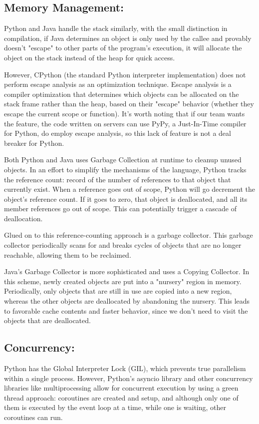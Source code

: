\subsection{Memory Management:}
Python and Java handle the stack similarly, with the small distinction in compilation, if Java determines an object is only used by the callee and provably doesn't "escape" to other parts of the program's execution, it will allocate the object on the stack instead of the heap for quick access.

However, CPython (the standard Python interpreter implementation) does not perform escape analysis as an optimization technique. Escape analysis is a compiler optimization that determines which objects can be allocated on the stack frame rather than the heap, based on their "escape" behavior (whether they escape the current scope or function).
It's worth noting that if our team wants the feature, the code written on servers can use PyPy, a Just-In-Time compiler for Python, do employ escape analysis, so this lack of feature is not a deal breaker for Python.

Both Python and Java uses Garbage Collection at runtime to cleanup unused objects. In an effort to simplify the mechanisms of the language, Python tracks the reference count: record of the number of references to that object that currently exist. When a reference goes out of scope, Python will go decrement the object's reference count. If it goes to zero, that object is deallocated, and all its member references go out of scope. This can potentially trigger a cascade of deallocation.

Glued on to this reference-counting approach is a garbage collector. This garbage collector periodically scans for and breaks cycles of objects that are no longer reachable, allowing them to be reclaimed.

Java's Garbage Collector is more sophisticated and uses a Copying Collector. In this scheme, newly created objects are put into a "nursery" region in memory. Periodically, only objects that are still in use are copied into a new region, whereas the other objects are deallocated by abandoning the nursery. This leads to favorable cache contents and faster behavior, since we don't need to visit the objects that are deallocated.

\subsection{Concurrency:}
Python has the Global Interpreter Lock (GIL), which prevents true parallelism within a single process. However, Python's asyncio library and other concurrency libraries like multiprocessing allow for concurrent execution by using a green thread approach:
coroutines are created and setup, and although only one of them is executed by the event loop at a time, while one is waiting, other coroutines can run.

